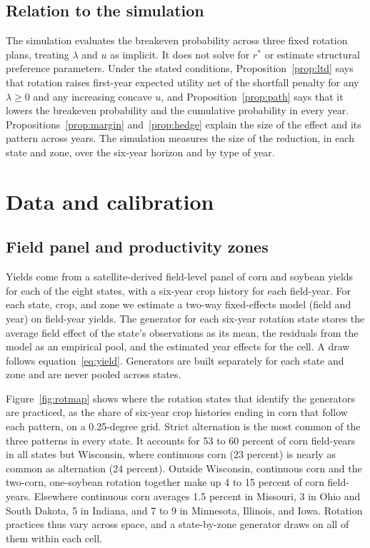 \documentclass[11pt,letterpaper]{article}
\theoremstyle{remark}
\begin{document}
\subsection{\label{relation_sim}Relation to the simulation}

The simulation evaluates the breakeven probability across three fixed rotation plans, treating $\lambda$ and $u$ as implicit. It does not solve for $r^*$ or estimate structural preference parameters. Under the stated conditions, Proposition~\ref{prop:ltd} says that rotation raises first-year expected utility net of the shortfall penalty for any $\lambda\ge0$ and any increasing concave $u$, and Proposition~\ref{prop:path} says that it lowers the breakeven probability and the cumulative probability in every year. Propositions~\ref{prop:margin} and~\ref{prop:hedge} explain the size of the effect and its pattern across years. The simulation measures the size of the reduction, in each state and zone, over the six-year horizon and by type of year.

\section{\label{sec:data}Data and calibration}

\subsection{Field panel and productivity zones}

Yields come from a satellite-derived field-level panel of corn and soybean yields for each of the eight states, with a six-year crop history for each field-year. For each state, crop, and zone we estimate a two-way fixed-effects model (field and year) on field-year yields. The generator for each six-year rotation state stores the average field effect of the state's observations as its mean, the residuals from the model as an empirical pool, and the estimated year effects for the cell. A draw follows equation~\eqref{eq:yield}. Generators are built separately for each state and zone and are never pooled across states.

Figure~\ref{fig:rotmap} shows where the rotation states that identify the generators are practiced, as the share of six-year crop histories ending in corn that follow each pattern, on a 0.25-degree grid. Strict alternation is the most common of the three patterns in every state. It accounts for 53 to 60 percent of corn field-years in all states but Wisconsin, where continuous corn (23 percent) is nearly as common as alternation (24 percent). Outside Wisconsin, continuous corn and the two-corn, one-soybean rotation together make up 4 to 15 percent of corn field-years. Elsewhere continuous corn averages 1.5 percent in Missouri, 3 in Ohio and South Dakota, 5 in Indiana, and 7 to 9 in Minnesota, Illinois, and Iowa. Rotation practices thus vary across space, and a state-by-zone generator draws on all of them within each cell.
\end{document}
